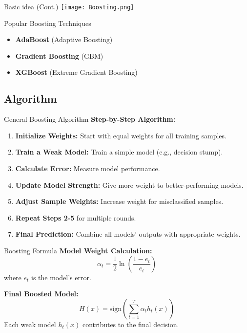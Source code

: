 \documentclass[serif, aspectratio=169]{beamer}
\begin{document}
\begin{frame}{Basic idea (Cont.)}
    \centering
    \texttt{[image: Boosting.png]}
\end{frame}

\begin{frame}{Popular Boosting Techniques}
    \begin{itemize}
        \item \textbf{AdaBoost} (Adaptive Boosting)
        \item \textbf{Gradient Boosting} (GBM)
        \item \textbf{XGBoost} (Extreme Gradient Boosting)
    \end{itemize}
\end{frame}

\subsection{Algorithm}

\begin{frame}{General Boosting Algorithm}
    \textbf{Step-by-Step Algorithm:}
    \begin{enumerate}
        \item \textbf{Initialize Weights:} Start with equal weights for all training samples.
        \item \textbf{Train a Weak Model:} Train a simple model (e.g., decision stump).
        \item \textbf{Calculate Error:} Measure model performance.
        \item \textbf{Update Model Strength:} Give more weight to better-performing models.
        \item \textbf{Adjust Sample Weights:} Increase weight for misclassified samples.
        \item \textbf{Repeat Steps 2-5} for multiple rounds.
        \item \textbf{Final Prediction:} Combine all models’ outputs with appropriate weights.
    \end{enumerate}
\end{frame}

\begin{frame}{Boosting Formula}
    \textbf{Model Weight Calculation:}
    \begin{equation}
        \alpha_t = \frac{1}{2} \ln \left( \frac{1 - e_t}{e_t} \right)
    \end{equation}
    where $e_t$ is the model's error.
    
    \textbf{Final Boosted Model:}
    \begin{equation}
        H(x) = \text{sign} \left( \sum_{t=1}^{T} \alpha_t h_t(x) \right)
    \end{equation}
    Each weak model $h_t(x)$ contributes to the final decision.
\end{frame}
\end{document}
